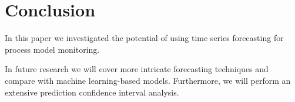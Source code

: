 \documentclass{svproc}
\begin{document}
\section{Conclusion}\label{sec:conclusion}
In this paper we investigated the potential of using time series forecasting for process model monitoring.

In future research we will cover more intricate forecasting techniques and compare with machine learning-based models.
Furthermore, we will perform an extensive prediction confidence interval analysis.



\end{document}
